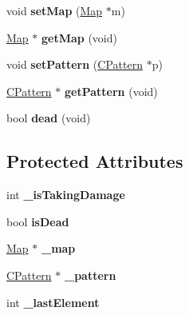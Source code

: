 \begin{DoxyCompactItemize}
\item 
\hypertarget{class_enemy_a89ebe8ca907bb2ad7254dcda08badf7c}{void {\bfseries set\+Map} (\hyperlink{class_map}{Map} $\ast$m)}\label{class_enemy_a89ebe8ca907bb2ad7254dcda08badf7c}

\item 
\hypertarget{class_enemy_a22caa0c2bb4878e11c17395dc485be83}{\hyperlink{class_map}{Map} $\ast$ {\bfseries get\+Map} (void)}\label{class_enemy_a22caa0c2bb4878e11c17395dc485be83}

\item 
\hypertarget{class_enemy_aaf8b58bb1a1c4f56dc4625ce445271e4}{void {\bfseries set\+Pattern} (\hyperlink{class_c_pattern}{C\+Pattern} $\ast$p)}\label{class_enemy_aaf8b58bb1a1c4f56dc4625ce445271e4}

\item 
\hypertarget{class_enemy_a5b987d9b49394d58f240a094116d3617}{\hyperlink{class_c_pattern}{C\+Pattern} $\ast$ {\bfseries get\+Pattern} (void)}\label{class_enemy_a5b987d9b49394d58f240a094116d3617}

\item 
\hypertarget{class_enemy_a4a3260187a25ea0ec2d6ffcaa8a7a87d}{bool {\bfseries dead} (void)}\label{class_enemy_a4a3260187a25ea0ec2d6ffcaa8a7a87d}

\end{DoxyCompactItemize}
\subsection*{Protected Attributes}
\begin{DoxyCompactItemize}
\item 
\hypertarget{class_enemy_a04b41e988f90d434cafa885f4df757b5}{int {\bfseries \+\_\+is\+Taking\+Damage}}\label{class_enemy_a04b41e988f90d434cafa885f4df757b5}

\item 
\hypertarget{class_enemy_a6e55221aa524f0f826feadfd0c567b70}{bool {\bfseries is\+Dead}}\label{class_enemy_a6e55221aa524f0f826feadfd0c567b70}

\item 
\hypertarget{class_enemy_a3949d0dcc37aad7902833bd3f5c2689f}{\hyperlink{class_map}{Map} $\ast$ {\bfseries \+\_\+map}}\label{class_enemy_a3949d0dcc37aad7902833bd3f5c2689f}

\item 
\hypertarget{class_enemy_aefda324c0dec1f6b8a72d441ad04f76b}{\hyperlink{class_c_pattern}{C\+Pattern} $\ast$ {\bfseries \+\_\+pattern}}\label{class_enemy_aefda324c0dec1f6b8a72d441ad04f76b}

\item 
\hypertarget{class_enemy_aab9e0868dbea218aeb3d92f724876f52}{int {\bfseries \+\_\+last\+Element}}\label{class_enemy_aab9e0868dbea218aeb3d92f724876f52}

\end{DoxyCompactItemize}
